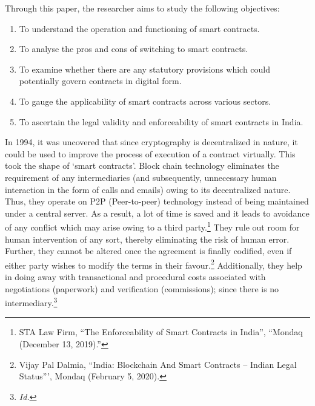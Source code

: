 \begin{multicols}{2}
\noi
Through this paper, the researcher aims to study the following objectives:

\vspace{-.2cm}

\begin{enumerate}[label=$\bullet$]
\item To understand the operation and functioning of smart contracts.
\item To analyse the pros and cons of switching to smart contracts.
\item To examine whether there are any statutory provisions which could potentially govern contracts in digital form.
\item To gauge the applicability of smart contracts across various sectors. 
\item To ascertain the legal validity and enforceability of smart contracts in India.
\end{enumerate}

\vspace{-.2cm}


\noi
In 1994, it was uncovered that since cryptography is decentralized in nature, it could be used
to improve the process of execution of a contract virtually. This took the shape of ‘smart
contracts’. Block chain technology eliminates the requirement of any intermediaries (and
subsequently, unnecessary human interaction in the form of calls and emails) owing to its
decentralized nature. Thus, they operate on P2P (Peer-to-peer) technology instead of being
maintained under a central server. As a result, a lot of time is saved and it leads to avoidance
of any conflict which may arise owing to a third party.\footnote{STA Law Firm, “The Enforceability of Smart Contracts in India”, “Mondaq (December 13, 2019).”}
 They rule out room for human
intervention of any sort, thereby eliminating the risk of human error. Further, they cannot be
altered once the agreement is finally codified, even if either party wishes to modify the terms
in their favour.\footnote{Vijay Pal Dalmia, “India: Blockchain And Smart Contracts – Indian Legal Status”’, Mondaq (February 5, 2020).}
 Additionally, they help in doing away with transactional and procedural costs
associated with negotiations (paperwork) and verification (commissions); since there is no
intermediary.\footnote{\textit{Id.}}


\end{multicols}

